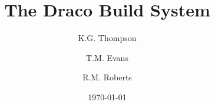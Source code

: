 \documentclass[reqno]{larep}
\begin{document}

\frontmatter

\title{The Draco Build System}
\author{K.G. Thompson}
\author{T.M. Evans}
\author{R.M. Roberts}
\address{CCS--4, MS D409, Los Alamos National Security, LLC, Los
  Alamos, NM 87544}


\date{\today}

\end{document}
